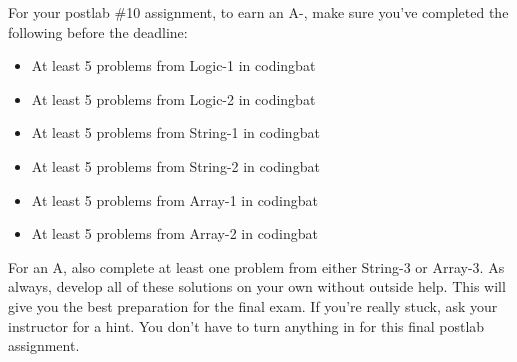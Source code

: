 For your postlab \#10 assignment, to earn an A-, make sure you've completed the following before the deadline:

\begin{itemize}
\item At least 5 problems from Logic-1 in codingbat
\item At least 5 problems from Logic-2 in codingbat
\item At least 5 problems from String-1 in codingbat
\item At least 5 problems from String-2 in codingbat
\item At least 5 problems from Array-1 in codingbat
\item At least 5 problems from Array-2 in codingbat
\end{itemize}

For an A, also complete at least one problem from either String-3 or Array-3. As always, develop all of these solutions on your own without outside help. This will give you the best preparation for the final exam. If you're really stuck, ask your instructor for a hint. You don't have to turn anything in for this final postlab assignment. 
